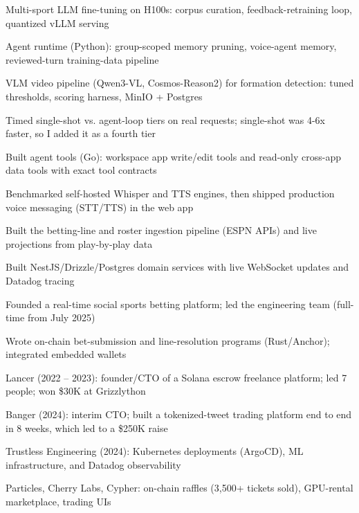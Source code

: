 \documentclass[print]{jack-resume}
\begin{document}
\begin{tightemize}
    \item Multi-sport LLM fine-tuning on H100s: corpus curation, feedback-retraining loop, quantized vLLM serving
    \item Agent runtime (Python): group-scoped memory pruning, voice-agent memory, reviewed-turn training-data pipeline
    \item VLM video pipeline (Qwen3-VL, Cosmos-Reason2) for formation detection: tuned thresholds, scoring harness, MinIO + Postgres
    \item Timed single-shot vs. agent-loop tiers on real requests; single-shot was 4-6x faster, so I added it as a fourth tier
    \item Built agent tools (Go): workspace app write/edit tools and read-only cross-app data tools with exact tool contracts
    \item Benchmarked self-hosted Whisper and TTS engines, then shipped production voice messaging (STT/TTS) in the web app
\end{tightemize}
\sectionsep

\begin{tightemize}
    \item Built the betting-line and roster ingestion pipeline (ESPN APIs) and live projections from play-by-play data
    \item Built NestJS/Drizzle/Postgres domain services with live WebSocket updates and Datadog tracing
    \item Founded a real-time social sports betting platform; led the engineering team (full-time from July 2025)
    \item Wrote on-chain bet-submission and line-resolution programs (Rust/Anchor); integrated embedded wallets
\end{tightemize}
\sectionsep

\begin{tightemize}
    \item Lancer (2022 – 2023): founder/CTO of a Solana escrow freelance platform; led 7 people; won \$30K at Grizzlython
    \item Banger (2024): interim CTO; built a tokenized-tweet trading platform end to end in 8 weeks, which led to a \$250K raise
    \item Trustless Engineering (2024): Kubernetes deployments (ArgoCD), ML infrastructure, and Datadog observability
    \item Particles, Cherry Labs, Cypher: on-chain raffles (3,500+ tickets sold), GPU-rental marketplace, trading UIs
\end{tightemize}
\sectionsep
\end{document}
